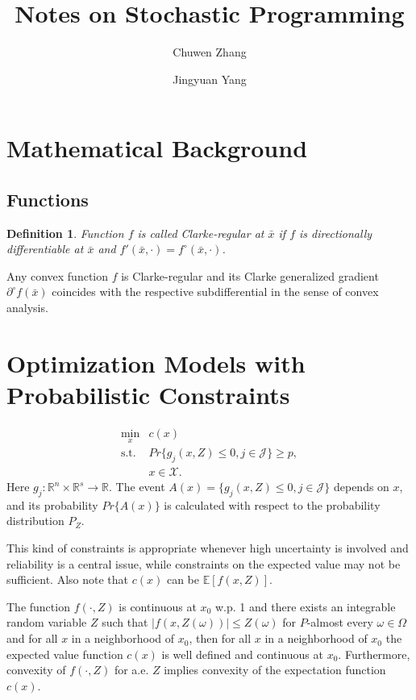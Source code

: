 \documentclass[a4pper,11pt]{article}
\title{Notes on Stochastic Programming}
\newtheorem{defn}{Definition}[section]
\begin{document}
\author[1]{\small Chuwen Zhang}
\author[1]{\small Jingyuan Yang}
\maketitle

\section{Mathematical Background}
\subsection{Functions}
\begin{defn}
Function $f$ is called Clarke-regular at $\bar x$ if $f$ is directionally differentiable at $\bar x$ and $f'(\bar x,\cdot)=f^\circ (\bar x,\cdot)$.
\end{defn}
Any convex function $f$ is Clarke-regular and its Clarke generalized gradient $\partial^\circ f(\bar x)$ coincides with the respective subdifferential in the sense of convex analysis.
\section{Optimization Models with Probabilistic Constraints}
\begin{equation}
    \label{4.1}
    \begin{array}{ll}
        \min_x   & c(x) \\
        \text{s.t.} & Pr\{g_j(x,Z)\leq 0,j\in \mathcal J\}\geq p,\\
        & x\in \mathcal X.
    \end{array}
\end{equation}
Here $g_j:\mathbb R^n\times \mathbb R^s\to \mathbb R$. The event $A(x)=\{g_j(x,Z)\leq 0,j\in \mathcal J\}$ depends on $x$, and its probability $Pr\{A(x)\}$ is calculated with respect to the probability distribution $P_Z$.

This kind of constraints is appropriate whenever high uncertainty is involved and reliability is a central issue, while constraints on the expected value may not be sufficient. Also note that $c(x)$ can be $\mathbb E[f(x,Z)]$.

The function $f(\cdot,Z)$ is continuous at $x_0$ w.p. 1 and there exists an integrable random variable $Z$ such that $|f (x, Z(\omega))|\leq  Z(\omega)$ for $P$-almost every $\omega\in \Omega$ and for all $x$ in a neighborhood of $x_0$, then for all $x$ in a neighborhood of $x_0$ the expected value function $c(x)$ is well deﬁned and continuous at $x_0$. Furthermore, convexity of $f (\cdot, Z)$ for a.e. $Z$ implies convexity of the expectation function $c(x)$.
\end{document}

